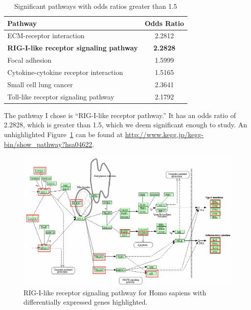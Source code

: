 \documentclass[12pt, a4paper]{report}
\begin{document}
\begin{table}[ht]
\begin{center}
\begin{tabular}{lc}
    Pathway                                         & Odds Ratio 	  \\ \hline
    ECM-receptor interaction                        & 2.2812   		  \\
    \textbf{RIG-I-like receptor signaling pathway}  & \textbf{2.2828} \\
    Focal adhesion                                  & 1.5999     	  \\
    Cytokine-cytokine receptor interaction          & 1.5165     	  \\
    Small cell lung cancer                          & 2.3641    	  \\
    Toll-like receptor signaling pathway            & 2.1792    	  \\
\end{tabular}
\caption{Significant pathways with odds ratios greater than 1.5 \label{sigPaths}}
\end{center}
\end{table}

The pathway I chose is ``RIG-I-like receptor pathway.'' It has an odds ratio of 2.2828, which is greater than 1.5, which we deem significant enough to study. An unhighlighted Figure~\ref{pathway} can be found at \url{http://www.kegg.jp/kegg-bin/show_pathway?hsa04622}.

\begin{figure}[ht]
\begin{center}
\includegraphics[width=16cm]{hsa04622.png}
\caption{RIG-I-like receptor signaling pathway for Homo sapiens with differentially expressed genes highlighted.}
\label{pathway}
\end{center}
\end{figure}
\end{document}
